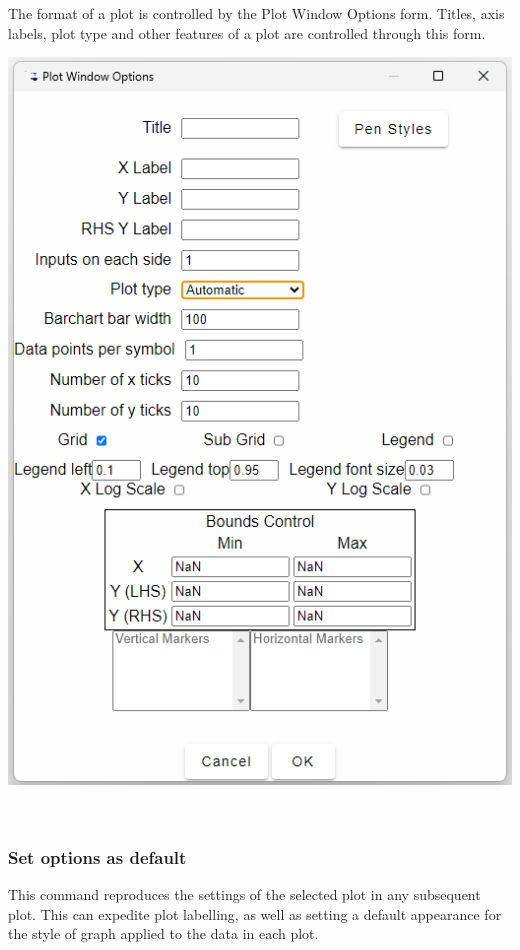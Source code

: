 The format of a plot is controlled by the Plot Window Options form.
Titles, axis labels, plot type and other features of a plot are controlled
through this form.
\begin{description}
\item [{\includegraphics{images/plotOptions}}]~
\end{description}

\subsubsection{Set options as default}

This command reproduces the settings of the selected plot in any subsequent
plot. This can expedite plot labelling, as well as setting a default
appearance for the style of graph applied to the data in each plot.

